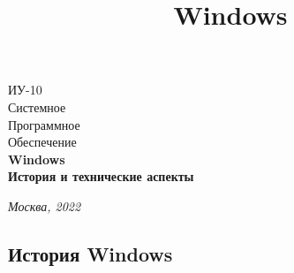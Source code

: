 \documentclass[14pt, a4paper]{article}
\title{Windows}
\begin{document}
\begin{titlepage}
    \topmargin=216pt
    \newpage
    \hangindent=0.7cm
    \huge ИУ-10\\
    Системное\\
    Программное\\
    Обеспечение\\
    \textbf{Windows\\ История и технические аспекты}

    \vspace{10cm}

    \begin{center}
        \small\textit{Москва, 2022}
    \end{center}
\end{titlepage}

\tableofcontents
\newpage

\begin{center}
\section*{История Windows}
\end{center}

\begin{figure}[h]%
    \centering
    \label{framework} %
\end{figure}
\end{document}
